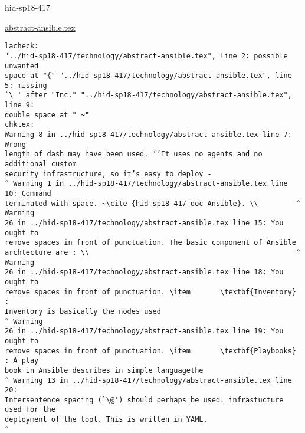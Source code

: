 \begin{IU}

hid-sp18-417

\href{https://github.com/cloudmesh-community/hid-sp18-417/blob/master//technology/abstract-ansible.tex}{abstract-ansible.tex}

\begin{tiny}
\begin{verbatim}
lacheck:
"../hid-sp18-417/technology/abstract-ansible.tex", line 2: possible unwanted
space at "{" "../hid-sp18-417/technology/abstract-ansible.tex", line 5: missing
`\ ' after "Inc." "../hid-sp18-417/technology/abstract-ansible.tex", line 9:
double space at " ~"
chktex:
Warning 8 in ../hid-sp18-417/technology/abstract-ansible.tex line 7: Wrong
length of dash may have been used. ‘‘It uses no agents and no additional custom
security infrastructure, so it’s easy to deploy -
^ Warning 1 in ../hid-sp18-417/technology/abstract-ansible.tex line 10: Command
terminated with space. ~\cite {hid-sp18-417-doc-Ansible}. \\         ^ Warning
26 in ../hid-sp18-417/technology/abstract-ansible.tex line 15: You ought to
remove spaces in front of punctuation. The basic component of Ansible
archtecture are : \\                                                 ^ Warning
26 in ../hid-sp18-417/technology/abstract-ansible.tex line 18: You ought to
remove spaces in front of punctuation. \item       \textbf{Inventory} :
Inventory is basically the nodes used                                 ^ Warning
26 in ../hid-sp18-417/technology/abstract-ansible.tex line 19: You ought to
remove spaces in front of punctuation. \item       \textbf{Playbooks} : A play
book in Ansible describes in simple languagethe
^ Warning 13 in ../hid-sp18-417/technology/abstract-ansible.tex line 20:
Intersentence spacing (`\@') should perhaps be used. infrastucture used for the
deployment of the tool. This is written in YAML.
^
\end{verbatim}
\end{tiny}
\end{IU}



